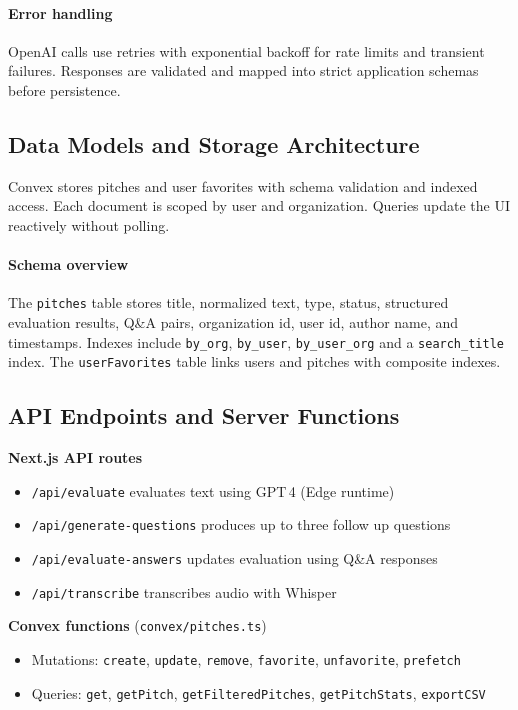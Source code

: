 \paragraph{Error handling} OpenAI calls use retries with exponential backoff for rate limits and transient failures. Responses are validated and mapped into strict application schemas before persistence.

\subsection{Data Models and Storage Architecture}\label{subsec:data-models-and-storage-architecture}
Convex stores pitches and user favorites with schema validation and indexed access. Each document is scoped by user and organization. Queries update the UI reactively without polling.

\paragraph{Schema overview} The \texttt{pitches} table stores title, normalized text, type, status, structured evaluation results, Q\&A pairs, organization id, user id, author name, and timestamps. Indexes include \texttt{by\_org}, \texttt{by\_user}, \texttt{by\_user\_org} and a \texttt{search\_title} index. The \texttt{userFavorites} table links users and pitches with composite indexes.

\subsection{API Endpoints and Server Functions}\label{subsec:api-and-server}
\textbf{Next.js API routes}
\begin{itemize}
  \item \texttt{/api/evaluate} evaluates text using GPT\,4 (Edge runtime)
  \item \texttt{/api/generate-questions} produces up to three follow up questions
  \item \texttt{/api/evaluate-answers} updates evaluation using Q\&A responses
  \item \texttt{/api/transcribe} transcribes audio with Whisper
\end{itemize}

\textbf{Convex functions} (\texttt{convex/pitches.ts})
\begin{itemize}
  \item Mutations: \texttt{create}, \texttt{update}, \texttt{remove}, \texttt{favorite}, \texttt{unfavorite}, \texttt{prefetch}
  \item Queries: \texttt{get}, \texttt{getPitch}, \texttt{getFilteredPitches}, \texttt{getPitchStats}, \texttt{exportCSV}
\end{itemize}

